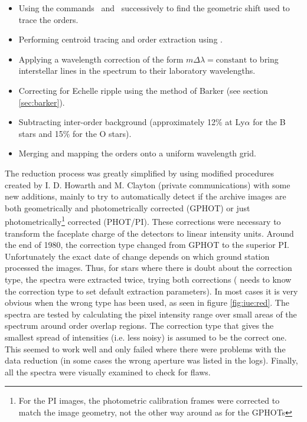 \begin{itemize}
\item	Using the commands \ and \ successively
	to find the geometric shift used to trace the orders.

\item	Performing centroid tracing and order extraction using
	.

\item	Applying a wavelength correction of the form $m \Delta\lambda =
	\mathrm{constant}$ to bring interstellar lines in the spectrum
	to their laboratory wavelengths.

\item 	Correcting for Echelle ripple using the method of Barker (see
	section \ref{sec:barker}).

\item	Subtracting inter-order background (approximately 12\% at
	Ly$\alpha$ for the B stars and 15\% for the O stars).

\item	Merging and mapping the orders onto a uniform wavelength grid.
\end{itemize}

The reduction process was greatly simplified by using modified
procedures created by I. D. Howarth and M. Clayton (private
communications) with some new additions, mainly to try to
automatically detect if the archive images are both geometrically and
photometrically corrected (GPHOT) or just photometrically\footnote{For
the PI images, the photometric calibration frames were corrected to
match the image geometry, not the other way around as for the GPHOTs}
corrected (PHOT/PI). These corrections were necessary to transform the
faceplate charge of the detectors to linear intensity units. Around
the end of 1980, the correction type changed from GPHOT to the
superior PI. Unfortunately the exact date of change depends on which
ground station processed the images. Thus, for stars where there is
doubt about the correction type, the spectra were extracted twice,
trying both corrections ( needs to know the correction
type to set default extraction parameters). In most cases it is very
obvious when the wrong type has been used, as seen in figure
\ref{fig:iue:red}. The spectra are tested by calculating the pixel
intensity range over small areas of the spectrum around order overlap
regions. The correction type that gives the smallest spread of
intensities (i.e. less noisy) is assumed to be the correct one. This
seemed to work well and only failed where there were problems with the
data reduction (in some cases the wrong aperture was listed in the
logs). Finally, all the spectra were visually examined to check for
flaws.

